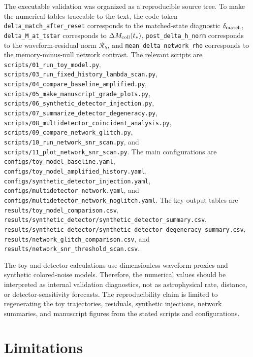 \documentclass[11pt]{article}
\begin{document}
The executable validation was organized as a reproducible source tree. To make the numerical tables traceable to the text, the code token \texttt{delta\_match\_after\_reset} corresponds to the matched-state diagnostic \(\delta_{\rm match}\), \texttt{delta\_M\_at\_tstar} corresponds to \(\Delta M_{\rm coll}(t_\ast)\), \texttt{post\_delta\_h\_norm} corresponds to the waveform-residual norm \(\mathcal{R}_h\), and \texttt{mean\_delta\_network\_rho} corresponds to the memory-minus-null network contrast. The relevant scripts are \texttt{scripts/01\_run\_toy\_model.py}, \texttt{scripts/03\_run\_fixed\_history\_lambda\_scan.py}, \texttt{scripts/04\_compare\_baseline\_amplified.py}, \texttt{scripts/05\_make\_manuscript\_grade\_plots.py}, \texttt{scripts/06\_synthetic\_detector\_injection.py}, \texttt{scripts/07\_summarize\_detector\_degeneracy.py}, \texttt{scripts/08\_multidetector\_coincident\_analysis.py}, \texttt{scripts/09\_compare\_network\_glitch.py}, \texttt{scripts/10\_run\_network\_snr\_scan.py}, and \texttt{scripts/11\_plot\_network\_snr\_scan.py}. The main configurations are \texttt{configs/toy\_model\_baseline.yaml}, \texttt{configs/toy\_model\_amplified\_history.yaml}, \texttt{configs/synthetic\_detector\_injection.yaml}, \texttt{configs/multidetector\_network.yaml}, and \texttt{configs/multidetector\_network\_noglitch.yaml}. The key output tables are \texttt{results/toy\_model\_comparison.csv}, \texttt{results/synthetic\_detector/synthetic\_detector\_summary.csv}, \texttt{results/synthetic\_detector/synthetic\_detector\_degeneracy\_summary.csv}, \texttt{results/network\_glitch\_comparison.csv}, and \texttt{results/network\_snr\_threshold\_scan.csv}.

The toy and detector calculations use dimensionless waveform proxies and synthetic colored-noise models. Therefore, the numerical values should be interpreted as internal validation diagnostics, not as astrophysical rate, distance, or detector-sensitivity forecasts. The reproducibility claim is limited to regenerating the toy trajectories, residuals, synthetic injections, network summaries, and manuscript figures from the stated scripts and configurations.

\section{Limitations}
\label{sec:limitations}
\end{document}
